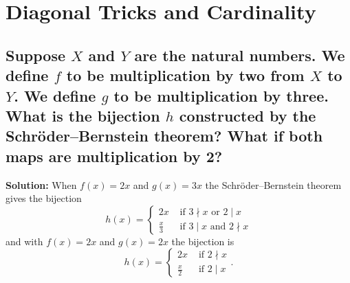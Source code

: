 \documentclass{article}
\newcommand{\exercise}[1]{\subsection{\normalfont #1}}
\newcommand{\solution}{\indent\indent \textbf{Solution: }}
\begin{document}
\newpage
\section{Diagonal Tricks and Cardinality}
\exercise{Suppose $X$ and $Y$ are the natural numbers. We define $f$ to be multiplication by two from $X$ to $Y$. We define $g$ to be multiplication by three. What is the bijection $h$ constructed by the Schröder–Bernstein theorem? What if both maps are multiplication by 2?}
\solution When $f(x) = 2x$ and $g(x) =3x$ the Schröder–Bernstein theorem gives the bijection
$$h(x) = 
\begin{cases}
2x &\text{ if } 3\nmid x \text { or } 2\mid x \\
\frac{x}{3} &\text{ if } 3\mid x \text{ and } 2\nmid x
\end{cases}$$
and with $f(x) = 2x$ and $g(x) = 2x$ the bijection is 
$$h(x) = 
\begin{cases} 
2x &\text{ if } 2\nmid x \\
\frac{x}{2} &\text{ if } 2\mid x
\end{cases}.$$
\end{document}

